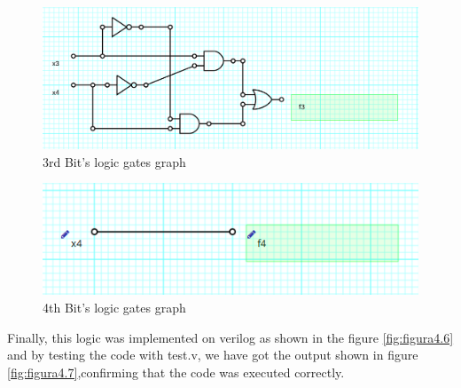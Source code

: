 \begin{figure}[h!] %
\begin{centering}
\includegraphics[scale=0.25]{E4TP1/images/3}
\par\end{centering}
\caption{\color{cyan}3rd Bit's logic gates graph}
\label{fig:figura4.4}
\end{figure}

\begin{figure}[h!]%
\begin{centering}
\includegraphics[scale=0.25]{E4TP1/images/4}
\par\end{centering}
\caption{\color{cyan}4th Bit's logic gates graph}
\label{fig:figura4.5}
\end{figure}

Finally, this logic was implemented on verilog as shown in the figure \ref{fig:figura4.6} and by testing the code
with test.v, we have got the output shown in figure \ref{fig:figura4.7},confirming that the code was executed
correctly.


